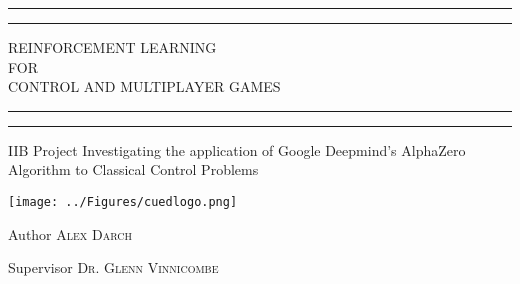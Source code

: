\documentclass[../main.tex]{subfiles}
\begin{document}
\begin{titlepage} %

	\centering %
	\scshape %
	\vspace*{\baselineskip} %
	\rule{\textwidth}{1.6pt}\vspace*{-\baselineskip}\vspace*{2pt} %
	\rule{\textwidth}{0.4pt} %
	\vspace{0.75\baselineskip} %
	
	{\LARGE REINFORCEMENT LEARNING \\ FOR \\ CONTROL AND MULTIPLAYER GAMES \\} %
	
	\vspace{0.75\baselineskip} %
	\rule{\textwidth}{0.4pt}\vspace*{-\baselineskip}\vspace{3.2pt} %
	\rule{\textwidth}{1.6pt} %
	\vspace{1\baselineskip} %
	
	
	IIB Project Investigating the application of Google Deepmind's AlphaZero Algorithm to Classical Control Problems 
	
    \vspace*{3\baselineskip} %
    \texttt{[image: ../Figures/cuedlogo.png]}
    \vspace*{2\baselineskip} %
	
	
	Author
	\vspace{0.5\baselineskip} %
    {\scshape\Large Alex Darch} %

    Supervisor
	\vspace{0.5\baselineskip} %
    {\scshape\Large Dr. Glenn Vinnicombe} %
    

\end{titlepage}
\end{document}
